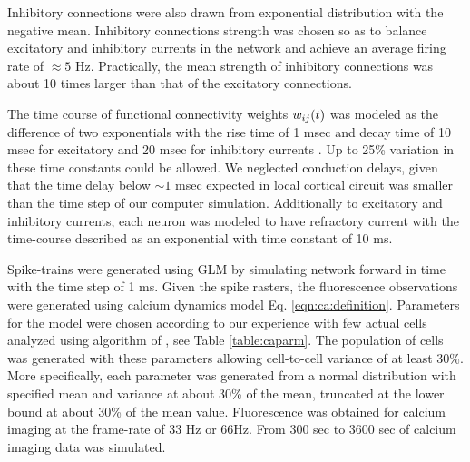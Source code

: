 Inhibitory connections were also drawn from exponential distribution with the negative mean. Inhibitory connections strength was chosen so as to balance excitatory and inhibitory currents in the network and achieve an average firing rate of  $\approx 5 $ Hz. Practically, the mean strength of inhibitory connections was about 10 times larger than that of the excitatory connections.

The time course of functional connectivity weights $w_{ij}(t)$ was modeled as the difference of two exponentials with the rise time of 1 msec and decay time of 10 msec for excitatory and 20 msec for inhibitory currents \cite{Sayer1990}. Up to 25\% variation in these time constants could be allowed. We neglected conduction delays, given that the time delay below $\sim 1$ msec expected in local cortical circuit was smaller than the time step of our computer simulation.  Additionally to excitatory and inhibitory currents, each neuron was modeled to have refractory current with the time-course described as an exponential with time constant of 10 ms.

Spike-trains were generated using GLM by simulating network forward in time with the time step of 1 ms.  Given the spike rasters, the fluorescence observations were generated using calcium dynamics model Eq. \eqref{eqn:ca:definition}. Parameters for the model were chosen according to our experience with few actual cells analyzed using algorithm of \cite{Vogelstein2009}, see Table \ref{table:caparm}.  The population of cells was generated with these parameters allowing cell-to-cell variance of at least 30\%. 
More specifically, each parameter was generated from a normal distribution with specified mean and variance at about 30\% of the mean, truncated at the lower bound at about 30\% of the mean value. Fluorescence was obtained for calcium imaging at the frame-rate of 33 Hz or 66Hz.  From 300 sec to 3600 sec of calcium imaging data was simulated.

